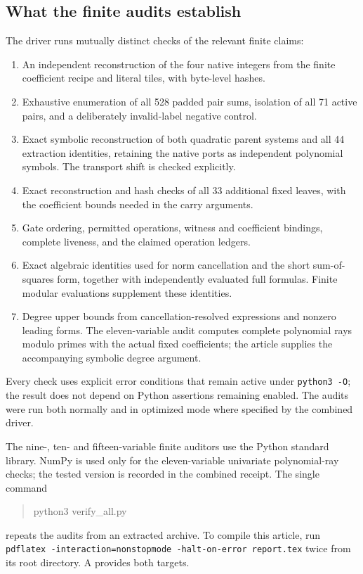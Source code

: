 \subsection{What the finite audits establish}
The driver runs mutually distinct checks of the relevant finite claims:
\begin{enumerate}[leftmargin=*]
\item An independent reconstruction of the four native integers from
 the finite coefficient recipe and literal tiles, with byte-level hashes.
\item Exhaustive enumeration of all 528 padded pair sums, isolation of
 all 71 active pairs, and a deliberately invalid-label negative control.
\item Exact symbolic reconstruction of both quadratic parent systems
 and all 44 extraction identities, retaining the native ports as
 independent polynomial symbols. The transport shift is checked explicitly.
\item Exact reconstruction and hash checks of all 33 additional fixed
 leaves, with the coefficient bounds needed in the carry arguments.
\item Gate ordering, permitted operations, witness and coefficient
 bindings, complete liveness, and the claimed operation ledgers.
\item Exact algebraic identities used for norm cancellation and the
 short sum-of-squares form, together with independently evaluated
 full formulas. Finite modular evaluations supplement these identities.
\item Degree upper bounds from cancellation-resolved expressions and
 nonzero leading forms. The eleven-variable audit computes complete
 polynomial rays modulo primes with the actual fixed coefficients;
 the article supplies the accompanying symbolic degree argument.
\end{enumerate}
Every check uses explicit error conditions that remain active under
\texttt{python3 -O}; the result does not depend on Python assertions
remaining enabled. The audits were run both normally and in optimized
mode where specified by the combined driver.

The nine-, ten- and fifteen-variable finite auditors use the Python
standard library. NumPy is used only for the eleven-variable univariate
polynomial-ray checks; the tested version is recorded in the combined
receipt. The single command
\begin{quote}\ttfamily
python3 verify\_all.py
\end{quote}
repeats the audits from an extracted archive. To compile this article,
run \texttt{pdflatex -interaction=nonstopmode -halt-on-error report.tex}
twice from its root directory. A  provides both targets.

